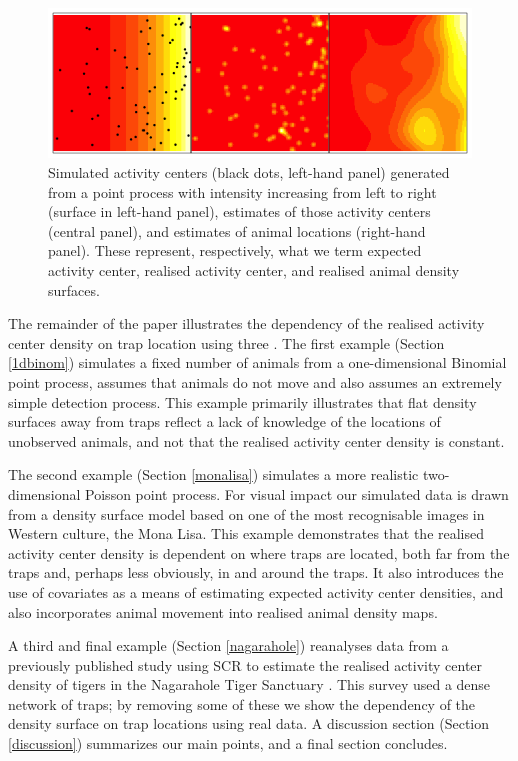 \documentclass[a4paper,12pt]{article}
\begin{document}
\begin{figure}[htbp]
\centering
\includegraphics[width=\textwidth]{density-plots.png}
\caption{Simulated activity centers (black dots, left-hand panel) generated from a point process with intensity increasing from left to right (surface in left-hand panel), estimates of those activity centers (central panel), and estimates of animal locations (right-hand panel). These represent, respectively, what we term expected activity center, realised activity center, and realised animal density surfaces.}
\label{introplot}
\end{figure}

The remainder of the paper illustrates the dependency of the realised activity center density on trap location using three . The first example (Section \ref{1dbinom}) simulates a fixed number of animals from a one-dimensional Binomial point process, assumes that animals do not move and also assumes an extremely simple detection process. This example primarily illustrates that flat density surfaces away from traps reflect a lack of knowledge of the locations of unobserved animals, and not that the realised activity center density is constant.

The second example (Section \ref{monalisa}) simulates a more realistic two-dimensional Poisson point process. For visual impact our simulated data is drawn from a density surface model based on one of the most recognisable images in Western culture, the Mona Lisa. This example demonstrates that the realised activity center density is dependent on where traps are located, both far from the traps and, perhaps less obviously, in and around the traps. It also introduces the use of covariates as a means of estimating expected activity center densities, and also incorporates animal movement into realised animal density maps.  

A third and final example (Section \ref{nagarahole}) reanalyses data from a previously published study using SCR to estimate the realised activity center density of tigers in the Nagarahole Tiger Sanctuary \cite{?}. This survey used a dense network of traps; by removing some of these we show the dependency of the density surface on trap locations using real data. A discussion section (Section \ref{discussion}) summarizes our main points, and a final section concludes.
\end{document}
